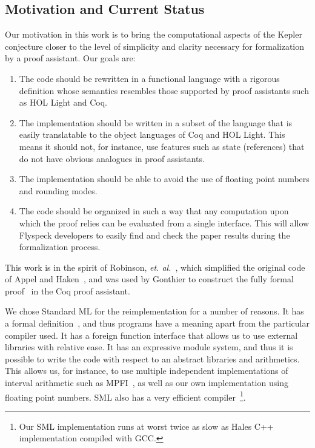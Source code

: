 \documentclass[11pt]{amsart}
\begin{document}



\subsection{Motivation and Current Status}
\label{sec:sean}

Our motivation in this work is to bring the computational aspects of
the Kepler conjecture closer to the level of simplicity and clarity
necessary for formalization by a proof assistant. Our goals are:

\begin{enumerate}
\item The code should be rewritten in a functional language with a
  rigorous definition whose semantics resembles those supported by
  proof assistants such as HOL Light and Coq.
\item The implementation should be written in a subset of the language
  that is easily translatable to the object languages of Coq and HOL
  Light. This means it should not, for instance, use features such as state
  (references) that do not have obvious analogues in proof assistants.
\item The implementation should be able to avoid the use of floating
  point numbers and rounding modes.
\item The code should be organized in such a way that any
  computation upon which the proof relies can be evaluated from a single
  interface.  This will allow Flyspeck developers to easily find and
  check the paper results during the formalization process.
\end{enumerate} 

\noindent This
work is in the spirit of Robinson, \textit{et.
al.}~\cite{Robertson:1997:JCTB}, which simplified the original code of
Appel and Haken~\cite{Appel:1986:FourColor}, and was used by Gonthier to
construct the fully formal proof~\cite{Gonthier:2005:FourColor} in the
Coq proof assistant. 

We chose Standard ML for the reimplementation for a number of reasons.
It has a formal definition~\cite{Milner:1990:SML}, and thus programs
have a meaning apart from the particular compiler used. It has a
foreign function interface that allows us to use external libraries
with relative ease. It has an expressive module system, and thus it is
possible to write the code with respect to an abstract libraries and
arithmetics. This allows us, for instance, to use multiple independent
implementations of interval arithmetic such as
MPFI~\cite{Revol:2005:MPFI}, as well as our own implementation using
floating point numbers. SML also has a very efficient
compiler~\cite{website:MLton}\footnote{Our SML implementation runs at
worst twice as slow as Hales C++ implementation compiled with GCC.}.
\end{document}
